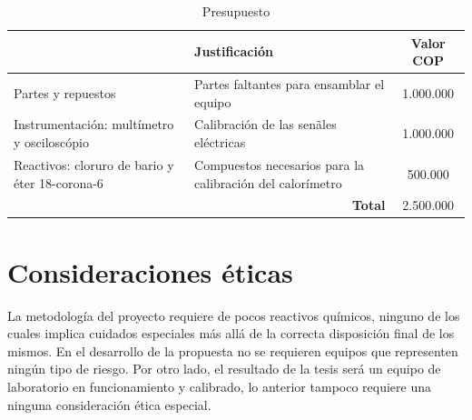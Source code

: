 	\begin{table}[h]
		\centering
		\caption{Presupuesto}
		\label{tb: presupuesto}
		\footnotesize
		\begin{tabular}{p{6cm}p{6cm}|c|}
			\hline
			\rowcolor[HTML]{C0C0C0} 
			
			\multicolumn{1}{|c|}{\textbf{Materiales}} & \textbf{Justificación} & \textbf{Valor COP} \\ \hline
			
			\multicolumn{1}{|p{5cm}|}{Partes y repuestos} & Partes faltantes para ensamblar el equipo & 1.000.000 \\ \hline
			
			\multicolumn{1}{|p{5cm}|}{Instrumentación: multímetro y osciloscópio} & Calibración de las sen\~ales eléctricas & 1.000.000 \\ \hline
			
			\multicolumn{1}{|p{5cm}|}{Reactivos: cloruro de bario y éter 18-corona-6} & Compuestos necesarios para la calibración del calorímetro & 500.000 \\ \hline
			
			& \multicolumn{1}{r|}{\textbf{Total}} & 2.500.000 \\ \cline{3-3}		
		\end{tabular}
	\end{table}

\section{Consideraciones éticas}
	La metodología del proyecto requiere de pocos reactivos químicos, ninguno de los cuales implica cuidados especiales más allá de la correcta disposición final de los mismos. En el desarrollo de la propuesta no se requieren equipos que representen ningún tipo de riesgo. Por otro lado, el resultado de la tesis será un equipo de laboratorio en funcionamiento y calibrado, lo anterior tampoco requiere una ninguna consideración ética especial.